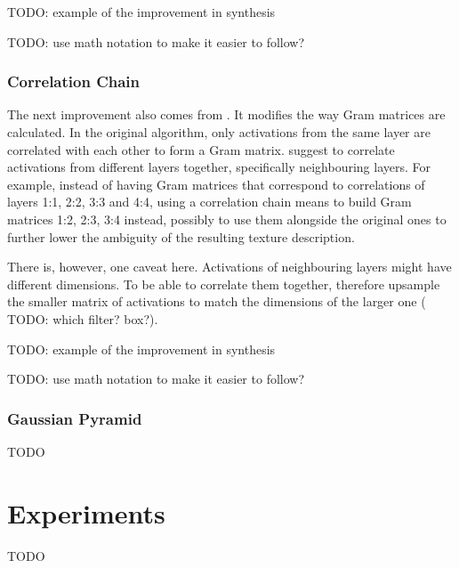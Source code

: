 {\color{red} TODO: example of the improvement in synthesis}

{\color{red} TODO: use math notation to make it easier to follow?}

\subsubsection{Correlation Chain}
\label{section:methods-texture_model-improvements-correlation_chain}

The next improvement also comes from \citet{Novak2016}. It modifies the way Gram matrices are calculated. In the original algorithm, only activations from the same layer are correlated with each other to form a Gram matrix. \citet{Novak2016} suggest to correlate activations from different layers together, specifically neighbouring layers. For example, instead of having Gram matrices that correspond to correlations of layers 1:1, 2:2, 3:3 and 4:4, using a correlation chain means to build Gram matrices 1:2, 2:3, 3:4 instead, possibly to use them alongside the original ones to further lower the ambiguity of the resulting texture description.

There is, however, one caveat here. Activations of neighbouring layers might have different dimensions. To be able to correlate them together, \citet{Novak2016} therefore upsample the smaller matrix of activations to match the dimensions of the larger one ({\color{red} TODO: which filter? box?}).

{\color{red} TODO: example of the improvement in synthesis}

{\color{red} TODO: use math notation to make it easier to follow?}

\subsubsection{Gaussian Pyramid}
\label{section:methods-texture_model-improvements-gaussian_pyramid}

{\color{red} TODO}

\section{Experiments}
\label{section:method-experiments}

{\color{red} TODO}